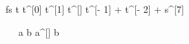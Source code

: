 \begin{eqcode}{f}{s}{}{}
  t \in {} \lend
  t^{[0]}  \lend
  t^{[1]}  \lend
  t^{[\iter]} \gets t^{[\iter - 1]} + t^{[\iter - 2]} + s^{[7]} \lend
   \lend
\end{eqcode}

\begin{eqcode}{\mu}{\ }{\ }{}
  a \in {} \lend
  b  \lend
  a^{[\iter]} \gets \iter \cdot \iter \cdot b \lend
   \lend
\end{eqcode}
